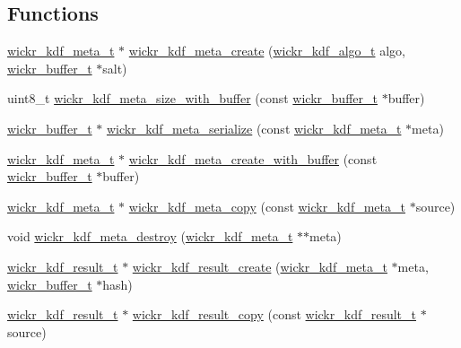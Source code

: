 \subsection*{Functions}
\begin{DoxyCompactItemize}
\item 
\hyperlink{structwickr__kdf__meta}{wickr\+\_\+kdf\+\_\+meta\+\_\+t} $\ast$ \hyperlink{group__wickr__kdf_gaf8d52b4e277d4e0eff6b60a510831b8c}{wickr\+\_\+kdf\+\_\+meta\+\_\+create} (\hyperlink{structwickr__kdf__algo}{wickr\+\_\+kdf\+\_\+algo\+\_\+t} algo, \hyperlink{structwickr__buffer}{wickr\+\_\+buffer\+\_\+t} $\ast$salt)
\item 
uint8\+\_\+t \hyperlink{group__wickr__kdf_ga92020ae3e8ffb469c927d17f95a7dff1}{wickr\+\_\+kdf\+\_\+meta\+\_\+size\+\_\+with\+\_\+buffer} (const \hyperlink{structwickr__buffer}{wickr\+\_\+buffer\+\_\+t} $\ast$buffer)
\item 
\hyperlink{structwickr__buffer}{wickr\+\_\+buffer\+\_\+t} $\ast$ \hyperlink{group__wickr__kdf_ga1bc501706b4a8a727dfd34f8a00e56da}{wickr\+\_\+kdf\+\_\+meta\+\_\+serialize} (const \hyperlink{structwickr__kdf__meta}{wickr\+\_\+kdf\+\_\+meta\+\_\+t} $\ast$meta)
\item 
\hyperlink{structwickr__kdf__meta}{wickr\+\_\+kdf\+\_\+meta\+\_\+t} $\ast$ \hyperlink{group__wickr__kdf_gaebd1caf94717c403c4afb5cca8f511b6}{wickr\+\_\+kdf\+\_\+meta\+\_\+create\+\_\+with\+\_\+buffer} (const \hyperlink{structwickr__buffer}{wickr\+\_\+buffer\+\_\+t} $\ast$buffer)
\item 
\hyperlink{structwickr__kdf__meta}{wickr\+\_\+kdf\+\_\+meta\+\_\+t} $\ast$ \hyperlink{group__wickr__kdf_ga6ed878108fd58ee420239689de505190}{wickr\+\_\+kdf\+\_\+meta\+\_\+copy} (const \hyperlink{structwickr__kdf__meta}{wickr\+\_\+kdf\+\_\+meta\+\_\+t} $\ast$source)
\item 
void \hyperlink{group__wickr__kdf_ga2bd458ae83d4d5bb03b9d0835baeefd7}{wickr\+\_\+kdf\+\_\+meta\+\_\+destroy} (\hyperlink{structwickr__kdf__meta}{wickr\+\_\+kdf\+\_\+meta\+\_\+t} $\ast$$\ast$meta)
\item 
\hyperlink{structwickr__kdf__result}{wickr\+\_\+kdf\+\_\+result\+\_\+t} $\ast$ \hyperlink{group__wickr__kdf_ga514c095b3b2f1ead49bd7fbf0b427407}{wickr\+\_\+kdf\+\_\+result\+\_\+create} (\hyperlink{structwickr__kdf__meta}{wickr\+\_\+kdf\+\_\+meta\+\_\+t} $\ast$meta, \hyperlink{structwickr__buffer}{wickr\+\_\+buffer\+\_\+t} $\ast$hash)
\item 
\hyperlink{structwickr__kdf__result}{wickr\+\_\+kdf\+\_\+result\+\_\+t} $\ast$ \hyperlink{group__wickr__kdf_ga69c03c94bf446471ba74f76ee883f8d4}{wickr\+\_\+kdf\+\_\+result\+\_\+copy} (const \hyperlink{structwickr__kdf__result}{wickr\+\_\+kdf\+\_\+result\+\_\+t} $\ast$source)
$$
\end{DoxyCompactItemize}
